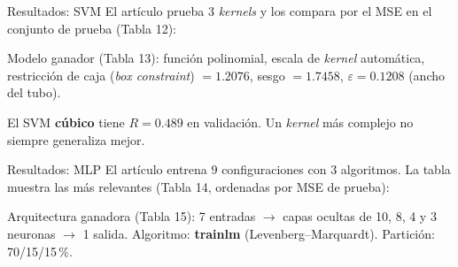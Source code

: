 \documentclass{beamer}
\begin{document}
\begin{frame}{Resultados: SVM}
    \justifying\small
    El artículo prueba 3 \textit{kernels} y los compara por el MSE en el conjunto de prueba (Tabla 12):
    \begin{table}
    \centering
    \end{table}
    \footnotesize Modelo ganador (Tabla 13): función polinomial, escala de \textit{kernel} automática, restricción de caja (\textit{box constraint}) $=1.2076$, sesgo $=1.7458$, $\varepsilon=0.1208$ (ancho del tubo).
    \medskip

    El SVM \textbf{cúbico} tiene $R=0.489$ en validación. Un \textit{kernel} más complejo no siempre generaliza mejor.
\end{frame}

\begin{frame}{Resultados: MLP}
    \justifying\small
    El artículo entrena 9 configuraciones con 3 algoritmos. La tabla muestra las más relevantes (Tabla 14, ordenadas por MSE de prueba):
    \begin{table}
    \centering
    \end{table}
    \footnotesize Arquitectura ganadora (Tabla 15): 7 entradas $\to$ capas ocultas de 10, 8, 4 y 3 neuronas $\to$ 1 salida. Algoritmo: \textbf{trainlm} (Levenberg--Marquardt). Partición: 70/15/15\,\%.
\end{frame}
\end{document}
